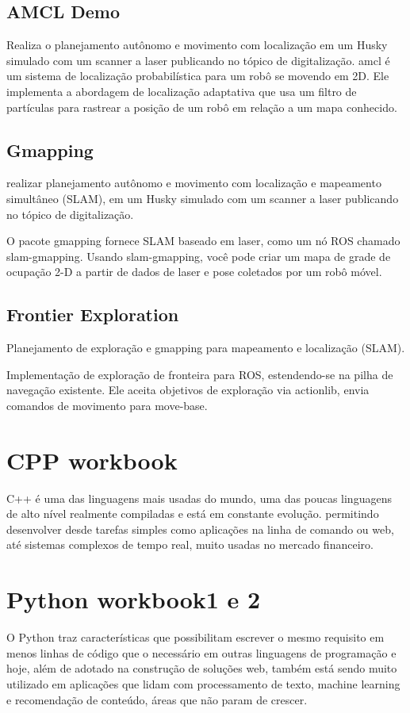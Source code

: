 \subsection{AMCL Demo}
Realiza o planejamento autônomo e movimento com localização em um Husky simulado com um scanner a laser publicando no tópico de digitalização.
amcl é um sistema de localização probabilística para um robô se movendo em 2D. Ele implementa a abordagem de localização adaptativa que usa um filtro de partículas para rastrear a posição de um robô em relação a um mapa conhecido.

\subsection{Gmapping}
realizar planejamento autônomo e movimento com localização e mapeamento simultâneo (SLAM), em um Husky simulado com um scanner a laser publicando no tópico de digitalização.

O pacote gmapping fornece SLAM baseado em laser, como um nó ROS chamado slam-gmapping. Usando slam-gmapping, você pode criar um mapa de grade de ocupação 2-D a partir de dados de laser e pose coletados por um robô móvel.
\subsection{Frontier Exploration}
Planejamento de exploração e gmapping para mapeamento e localização (SLAM).

Implementação de exploração de fronteira para ROS, estendendo-se na pilha de navegação existente. Ele aceita objetivos de exploração via actionlib, envia comandos de movimento para move-base.
 \section{CPP workbook}
 C++ é uma das linguagens mais usadas do mundo, uma das poucas linguagens de alto nível realmente compiladas e está em constante evolução.
 permitindo desenvolver desde tarefas simples como aplicações na linha de comando ou web, até sistemas complexos de tempo real, muito usadas no mercado financeiro.
 \section{Python workbook1 e 2}
 O Python traz características que possibilitam escrever o mesmo requisito em menos linhas de código que o necessário em outras linguagens de programação e hoje, além de adotado na construção de soluções web, também está sendo muito utilizado em aplicações que lidam com processamento de texto, machine learning e recomendação de conteúdo, áreas que não param de crescer.

